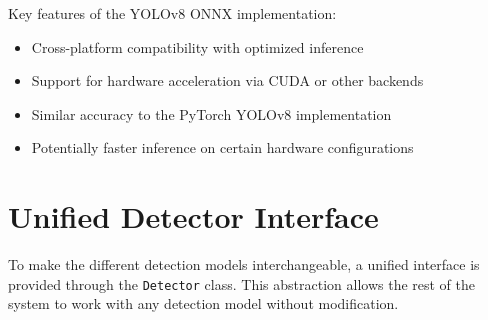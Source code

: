 Key features of the YOLOv8 ONNX implementation:
\begin{itemize}
    \item Cross-platform compatibility with optimized inference
    \item Support for hardware acceleration via CUDA or other backends
    \item Similar accuracy to the PyTorch YOLOv8 implementation
    \item Potentially faster inference on certain hardware configurations
\end{itemize}

\section{Unified Detector Interface}
To make the different detection models interchangeable, a unified interface is provided through the \texttt{Detector} class. This abstraction allows the rest of the system to work with any detection model without modification.

